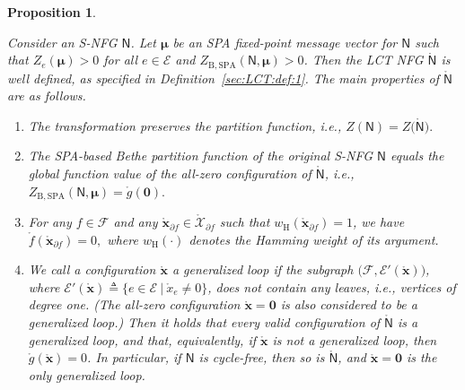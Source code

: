 \documentclass[journal]{IEEEtran}
\newcommand{\add}[1]{{\color{black}#1}}
\newtheorem{proposition}[theorem]{Proposition}
\newcommand{\vect}[1]{ \bm{#1} }
\newcommand{\setEfull}{ \mathcal{E} }
\newcommand{\setF}{ \mathcal{F} }
\newcommand{\setpf}{ \partial f }
\newcommand{\vmu}{ \vect{ \mu } }
\newcommand{\wh}{w_{\mathrm{H}}}
\newcommand{\graphN}{ \mathsf{N} }
\newcommand{\setE}{ \mathcal{E} }
\newcommand{\defeq}{ \triangleq }
\newcommand{\ZBSPA}{ Z_{\mathrm{B,SPA}} }
\newcommand{\LCTset}[1]{\mathring{\mathcal{#1}}}
\newcommand{\LCTv}[1]{ \mathring{ \vect{#1} } }
\newcommand{\LCT}[1]{ \mathring{#1} }
\newcommand{\LCTvxf}{ \LCTv{x}_{\setpf} }
\newcommand{\LCTsetxf}{ \LCTset{X}_{\setpf} }
\newcommand*{\ie}{\textit{i.e.}}
\begin{document}
\begin{proposition}
  \label{sec:LCT:prop:1}

  Consider an S-NFG $\graphN$. Let
  $\vmu $ be an SPA
  fixed-point message vector for $\graphN$ such that $ Z_e(\vmu) >0 $ for all $ e \in \setEfull $ and $ \ZBSPA(\graphN,\vmu) > 0 $. Then the LCT NFG $\LCT{\graphN}$ is well defined, as specified in
  Definition~\ref{sec:LCT:def:1}.
  The main properties of $\LCT{\graphN}$ are as follows.
  \begin{enumerate}

    \item\label{sec:LCT:prop:1:item:1} \add{The transformation preserves the partition function}, \ie,
          $
            Z(\graphN)
            = Z\bigl( \LCT{\graphN} \bigr).
          $

    \item\label{sec:LCT:prop:1:item:2} The SPA-based Bethe partition function of the original S-NFG $\graphN$ equals the global function value of the all-zero configuration of $\LCT{\graphN}$, \ie,
          $
            \ZBSPA(\graphN,\vmu)
            = \LCT{g}(\vect{0}).
          $

    \item\label{sec:LCT:prop:1:item:3} \add{For any $f \in \setF$ and any $\LCTvxf \in \LCTsetxf$ such that $ \wh( \LCTvxf ) = 1 $, we have}
          $
            \LCT{f}(\LCTvxf)
            = 0,
          $
          \add{where $ \wh( \cdot ) $ denotes the Hamming weight of its argument.}

    \item\label{sec:LCT:prop:1:item:4} \add{We call a configuration
            $\LCTv{x}$ a generalized loop if the subgraph
            $\bigl( \setF,\setE'(\LCTv{x}) \bigr)$, where
            $\setE'(\LCTv{x}) \defeq \{ e \in \setE \ | \ \LCT{x}_{e} \neq 0
              \}$, does not contain any leaves, \ie, vertices of degree
            one. (The all-zero configuration $\LCTv{x} = \vect{0}$ is also
            considered to be a generalized loop.) Then it holds that every
            valid configuration of $\LCT{\graphN}$ is a generalized loop, and
            that, equivalently, if $\LCTv{x}$ is not a generalized loop, then
            $\LCT{g}(\LCTv{x}) = 0$.  In particular, if $\graphN$ is
            cycle-free, then so is $\LCT{\graphN}$, and $\LCTv{x} = \vect{0}$
            is the only generalized loop.}


\end{enumerate}
\end{proposition}
\end{document}
